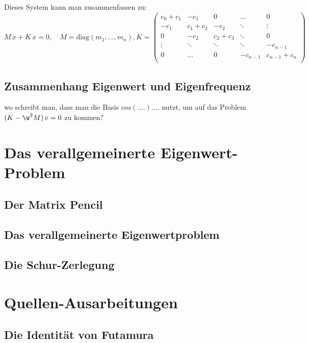 \documentclass[ngerman,BCOR=4mm]{tudscrreprt}
\theoremstyle{plain} %
\theoremstyle{definition} %
\theoremstyle{remark}
\begin{document}
            Dieses System kann man zusammenfassen zu:
            $$M\,\ddot x + K\,x = 0,\quad M= \text{diag}(m_1,\dots,m_n),
            K = \begin{pmatrix}
                  c_0+c_1 & -c_1 &  0& ... & 0 \\
                  -c_1 & c_1+c_2 & -c_2 & \ddots & \vdots \\
                   0& -c_2 & c_2+c_3 & \ddots & 0 \\
                   \vdots & \ddots & \ddots & \ddots  & -c_{n-1} \\
                   0& ... & 0& -c_{n-1} & c_{n-1}+c_n \\
                  \end{pmatrix}$$

      \section{Zusammenhang Eigenwert und Eigenfrequenz}

            wo schreibt man, dass man die Basis $cos(....)....$ nutzt, um auf das Problem $(K-\w^2 M)\, v = 0$ zu kommen?


\chapter{Das verallgemeinerte Eigenwert-Problem}
\label{sec: EW Problem}
      \section{Der Matrix Pencil}

      \section{Das verallgemeinerte Eigenwertproblem}

      \section{Die Schur-Zerlegung}

\chapter{Quellen-Ausarbeitungen}
\label{sec: Quellen}
      \section{Die Identität von Futamura}
\end{document}
